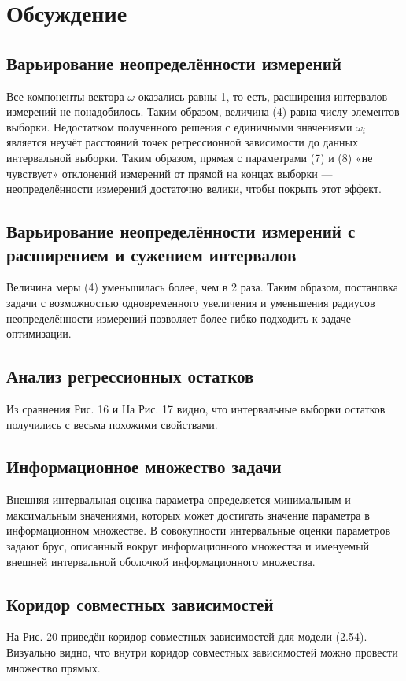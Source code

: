 \documentclass[a4paper,14pt]{article}
\begin{document}
	\section{Обсуждение}
	\subsection{Варьирование неопределённости измерений}
	Все компоненты вектора $\omega$ оказались равны 1, то есть, расширения интервалов измерений не понадобилось. Таким образом, величина (4) равна числу элементов выборки. Недостатком полученного решения с единичными значениями $\omega_i$ является неучёт расстояний точек
	регрессионной зависимости до данных интервальной выборки. Таким образом, прямая с параметрами (7) и (8) «не чувствует» отклонений измерений от прямой на концах выборки — неопределённости измерений достаточно велики, чтобы покрыть этот эффект.
	
	\subsection{Варьирование неопределённости измерений с расширением и сужением интервалов}
	Величина меры (4) уменьшилась более, чем в 2 раза. Таким образом, постановка задачи с возможностью одновременного увеличения и уменьшения радиусов неопределённости измерений позволяет более гибко подходить к задаче оптимизации.
	
	\subsection{Анализ регрессионных остатков}
	Из сравнения Рис. 16 и На Рис. 17 видно, что интервальные выборки остатков получились с весьма похожими свойствами.
	
	\subsection{Информационное множество задачи}
	Внешняя интервальная оценка параметра определяется минимальным и максимальным значениями, которых может достигать значение параметра в информационном множестве.
	В совокупности интервальные оценки параметров задают брус, описанный вокруг информационного множества и именуемый внешней интервальной оболочкой информационного
	множества.
	
	\subsection{Коридор совместных зависимостей}
	На Рис. 20 приведён коридор совместных зависимостей для модели (2.54). Визуально видно, что внутри коридор совместных зависимостей можно провести множество прямых.
	
\end{document}
